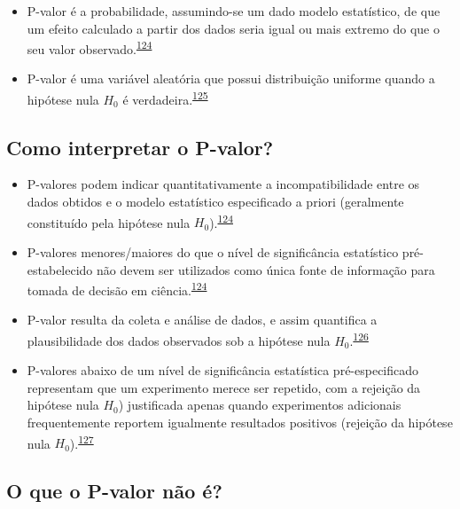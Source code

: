 \documentclass[
  a4paper,
]{book}
\begin{document}
\begin{itemize}
\item
  P-valor é a probabilidade, assumindo-se um dado modelo estatístico, de que um efeito calculado a partir dos dados seria igual ou mais extremo do que o seu valor observado.\textsuperscript{\protect\hyperlink{ref-wasserstein2016}{124}}
\item
  P-valor é uma variável aleatória que possui distribuição uniforme quando a hipótese nula \(H_{0}\) é verdadeira.\textsuperscript{\protect\hyperlink{ref-altman2017}{125}}
\end{itemize}

\hypertarget{como-interpretar-o-p-valor}{%
\subsection{Como interpretar o P-valor?}\label{como-interpretar-o-p-valor}}

\begin{itemize}
\item
  P-valores podem indicar quantitativamente a incompatibilidade entre os dados obtidos e o modelo estatístico especificado a priori (geralmente constituído pela hipótese nula \(H_{0}\)).\textsuperscript{\protect\hyperlink{ref-wasserstein2016}{124}}
\item
  P-valores menores/maiores do que o nível de significância estatístico pré-estabelecido não devem ser utilizados como única fonte de informação para tomada de decisão em ciência.\textsuperscript{\protect\hyperlink{ref-wasserstein2016}{124}}
\item
  P-valor resulta da coleta e análise de dados, e assim quantifica a plausibilidade dos dados observados sob a hipótese nula \(H_{0}\).\textsuperscript{\protect\hyperlink{ref-heinze2016}{126}}
\item
  P-valores abaixo de um nível de significância estatística pré-especificado representam que um experimento merece ser repetido, com a rejeição da hipótese nula \(H_{0}\)) justificada apenas quando experimentos adicionais frequentemente reportem igualmente resultados positivos (rejeição da hipótese nula \(H_{0}\)).\textsuperscript{\protect\hyperlink{ref-goodman2016}{127}}
\end{itemize}

\hypertarget{o-que-o-p-valor-nuxe3o-uxe9}{%
\subsection{O que o P-valor não é?}\label{o-que-o-p-valor-nuxe3o-uxe9}}
\end{document}
